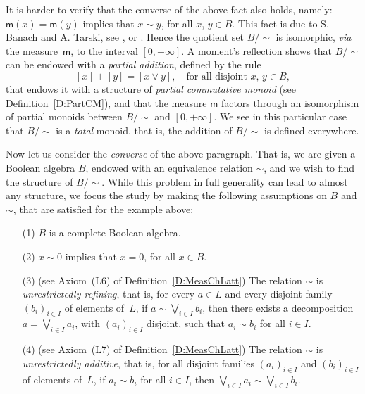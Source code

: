 \documentclass[psamsfonts,reqno]{memo-l}
\theoremstyle{plain}
\theoremstyle{definition}
\theoremstyle{remark}
\numberwithin{equation}{section}
\newcommand{\mm}{\mathsf{m}}
\newcommand{\pcm}{partial commutative mon\-oid}
\newcommand{\famm}[2]{(#1)_{#2}}
\begin{document}
It is harder to verify that the converse of the above fact
also holds, namely: $\mm(x)=\mm(y)$ implies that $x\sim y$, for
all $x$, $y\in B$. This fact is due to S. Banach and A. Tarski,
see \cite{BaTa24},
or \cite[Theorem~9.17]{Wago85}. Hence the quotient 
set $B/{\sim}$ is
isomorphic, \emph{via} the measure~$\mm$, to the interval $[0,+\infty]$. A
moment's reflection shows that $B/{\sim}$ can be endowed with a \emph{partial
addition}, defined by the rule
   \[
   [x]+[y]=[x\vee y],\quad\text{for all disjoint }x,\,y\in B,
   \]
that endows it with a structure of \emph{\pcm} (see Definition~\ref{D:PartCM}), and that the measure $\mm$ factors
through an isomorphism of partial monoids between $B/{\sim}$ and
$[0,+\infty]$. We see in this particular case that $B/{\sim}$ is a
\emph{total} monoid, that is, the addition of $B/{\sim}$ is defined
everywhere.

\smallskip

Now let us consider the \emph{converse} of the above paragraph. That is, we
are given a Boolean algebra $B$, endowed with an
equivalence relation $\sim$, and we wish to find the structure of
$B/{\sim}$. While this problem in full generality can lead to almost any
structure, we focus the study by making the following assumptions on $B$ and
$\sim$, that are satisfied for the example above:
\begin{itemize}
\item[(1)] $B$ is a complete Boolean
algebra.

\item[(2)] $x\sim 0$ implies that $x=0$, for all $x\in B$.

\item[(3)] (see Axiom~(L6) of Definition~\ref{D:MeasChLatt}) The relation
$\sim$ is \emph{unrestrictedly refining},
 that is, for every $a\in L$ and
every disjoint family $\famm{b_i}{i\in I}$ of elements of~$L$, if
$a\sim\bigvee_{i\in I}b_i$, then there exists a decomposition
$a=\bigvee_{i\in I}a_i$, with $\famm{a_i}{i\in I}$ disjoint, such that
$a_i\sim b_i$ for all $i\in I$.

\item[(4)] (see Axiom~(L7) of Definition~\ref{D:MeasChLatt}) The relation
$\sim$ is \emph{unrestrictedly additive},
 that is, for all disjoint
families $\famm{a_i}{i\in I}$ and $\famm{b_i}{i\in I}$ of elements
of~$L$, if $a_i\sim b_i$ for all $i\in I$, then
$\bigvee_{i\in I}a_i\sim\bigvee_{i\in I}b_i$.
\end{itemize}
\end{document}
